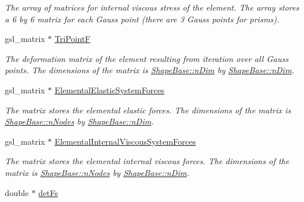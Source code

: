 \begin{DoxyCompactItemize}
\begin{DoxyCompactList}\small\item\em The array of matrices for internal viscous stress of the element. The array stores a 6 by 6 matrix for each Gauss point (there are 3 Gauss points for prisms). \end{DoxyCompactList}\item 
\hypertarget{classShapeBase_ab7ac8f14929ab37e8eae5fcaf93b18a8}{}gsl\+\_\+matrix $\ast$ \hyperlink{classShapeBase_ab7ac8f14929ab37e8eae5fcaf93b18a8}{Tri\+Point\+F}\label{classShapeBase_ab7ac8f14929ab37e8eae5fcaf93b18a8}

\begin{DoxyCompactList}\small\item\em The deformation matrix of the element resulting from iteration over all Gauss points. The dimensions of the matrix is \hyperlink{classShapeBase_a250bd3396546342c8104f5b9c180d18f}{Shape\+Base\+::n\+Dim} by \hyperlink{classShapeBase_a250bd3396546342c8104f5b9c180d18f}{Shape\+Base\+::n\+Dim}. \end{DoxyCompactList}\item 
\hypertarget{classShapeBase_a94d201c88c73283f2e9711d1cc038e02}{}gsl\+\_\+matrix $\ast$ \hyperlink{classShapeBase_a94d201c88c73283f2e9711d1cc038e02}{Elemental\+Elastic\+System\+Forces}\label{classShapeBase_a94d201c88c73283f2e9711d1cc038e02}

\begin{DoxyCompactList}\small\item\em The matrix stores the elemental elastic forces. The dimensions of the matrix is \hyperlink{classShapeBase_ae7dd93b58b3281ce90025f83d0f0e976}{Shape\+Base\+::n\+Nodes} by \hyperlink{classShapeBase_a250bd3396546342c8104f5b9c180d18f}{Shape\+Base\+::n\+Dim}. \end{DoxyCompactList}\item 
\hypertarget{classShapeBase_a54b5ebd33ad4ed5739c0431bf0d4346d}{}gsl\+\_\+matrix $\ast$ \hyperlink{classShapeBase_a54b5ebd33ad4ed5739c0431bf0d4346d}{Elemental\+Internal\+Viscous\+System\+Forces}\label{classShapeBase_a54b5ebd33ad4ed5739c0431bf0d4346d}

\begin{DoxyCompactList}\small\item\em The matrix stores the elemental internal viscous forces. The dimensions of the matrix is \hyperlink{classShapeBase_ae7dd93b58b3281ce90025f83d0f0e976}{Shape\+Base\+::n\+Nodes} by \hyperlink{classShapeBase_a250bd3396546342c8104f5b9c180d18f}{Shape\+Base\+::n\+Dim}. \end{DoxyCompactList}\item 
\hypertarget{classShapeBase_ab41f6a16647607b1c898eea1c2860367}{}double $\ast$ \hyperlink{classShapeBase_ab41f6a16647607b1c898eea1c2860367}{det\+Fs}\label{classShapeBase_ab41f6a16647607b1c898eea1c2860367}


\end{DoxyCompactItemize}

